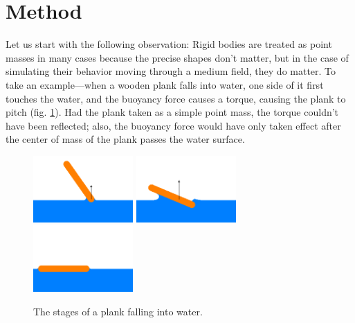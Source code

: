 \section{Method}

Let us start with the following observation:
Rigid bodies are treated as point masses in many cases because the precise shapes don't matter, but in the case of simulating their behavior moving through a medium field, they do matter.
To take an example---when a wooden plank falls into water, one side of it first touches the water, and the buoyancy force causes a torque, causing the plank to pitch (fig. \ref{fig:plank-falling-into-water-illustration}).
Had the plank taken as a simple point mass, the torque couldn't have been reflected;
also, the buoyancy force would have only taken effect after the center of mass of the plank passes the water surface.

\begin{figure}[h]
	\def\ih{1in}
	\centering
	\includegraphics[height=\ih]{../Thesis/figures/stages-of-a-plank-falling-into-water/1.png}
	\includegraphics[height=\ih]{../Thesis/figures/stages-of-a-plank-falling-into-water/2.png}
	\includegraphics[height=\ih]{../Thesis/figures/stages-of-a-plank-falling-into-water/3.png}
	\caption{The stages of a plank falling into water.}
	\label{fig:plank-falling-into-water-illustration}
\end{figure}


